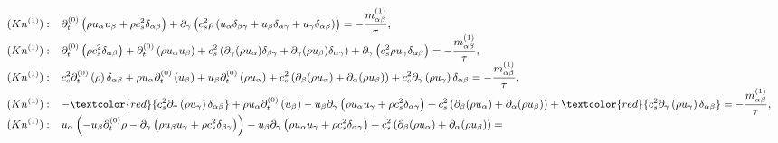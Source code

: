 \documentclass[letterpaper,10pt,english,openany,oneside]{jupyterBook}
\begin{document}
\begin{equation}\label{equation:Refs/LBM-Study/intro-nse-lbm/Navier-Stokes-Equation:ns-e-Kn1-B2-all}
\begin{split}
\small
\begin{array}{ll}
(Kn^{(1)}):& \partial_{t}^{(0)}  \left(\rho u_{\alpha}u_{\beta} + \rho c_{s}^{2}\delta_{\alpha\beta} \right) + \partial_{\gamma} \left(c_{s}^{2}\rho \left(u_{\alpha}\delta_{\beta\gamma} + u_{\beta}\delta_{\alpha\gamma} + u_{\gamma}\delta_{\alpha\beta} \right) \right) = - \displaystyle\frac{m^{(1)}_{\alpha\beta}}{\tau},\\
(Kn^{(1)}):& \partial_{t}^{(0)}  \left(\rho c_{s}^{2}\delta_{\alpha\beta} \right) + \partial_{t}^{(0)}  \left(\rho u_{\alpha}u_{\beta} \right) +  c_{s}^{2} \left(\partial_{\gamma} (\rho u_{\alpha})\delta_{\beta\gamma} + \partial_{\gamma}(\rho u_{\beta} )\delta_{\alpha\gamma} \right) + \partial_{\gamma} \left(c_{s}^{2}\rho u_{\gamma}\delta_{\alpha\beta} \right) = - \displaystyle\frac{m^{(1)}_{\alpha\beta}}{\tau},\\
(Kn^{(1)}):& c_{s}^{2} \partial_{t}^{(0)}  \left(\rho\right) \delta_{\alpha\beta} + \rho u_{\alpha} \partial_{t}^{(0)} \left(u_{\beta} \right) + u_{\beta}\partial_{t}^{(0)}  \left(\rho u_{\alpha}\right) +  c_{s}^{2} \left(\partial_{\beta} (\rho u_{\alpha}) + \partial_{\alpha} (\rho u_{\beta}) \right) + c_{s}^{2} \partial_{\gamma} \left(\rho u_{\gamma} \right) \delta_{\alpha\beta} = - \displaystyle\frac{m^{(1)}_{\alpha\beta}}{\tau},\\
(Kn^{(1)}):& -\textcolor{red}{c_{s}^{2} \partial_{\gamma} \left( \rho u_{\gamma} \right)\delta_{\alpha\beta}} + 
            \rho u_{\alpha} \partial_{t}^{(0)} \left(u_{\beta} \right) - 
            u_{\beta} \partial_{\gamma} \left(\rho u_{\alpha}u_{\gamma} + \rho c_{s}^{2}\delta_{\alpha\gamma} \right) +  
            c_{s}^{2} \left(\partial_{\beta} (\rho u_{\alpha}) + \partial_{\alpha} (\rho u_{\beta}) \right) + 
            \textcolor{red}{c_{s}^{2} \partial_{\gamma} \left(\rho u_{\gamma} \right) \delta_{\alpha\beta}} = 
            - \displaystyle\frac{m^{(1)}_{\alpha\beta}}{\tau},\\
(Kn^{(1)}):& u_{\alpha} \left( -u_{\beta}\partial_{t}^{(0)} \rho  - \partial_{\gamma} \left(\rho u_{\beta}u_{\gamma} + \rho c_{s}^{2}\delta_{\beta\gamma} \right)\right) - 
            u_{\beta} \partial_{\gamma} \left(\rho u_{\alpha}u_{\gamma} + \rho c_{s}^{2}\delta_{\alpha\gamma} \right) +  
            c_{s}^{2} \left(\partial_{\beta} (\rho u_{\alpha}) + \partial_{\alpha} (\rho u_{\beta}) \right) = 

\end{array}
\end{split}
\end{equation}
\end{document}
